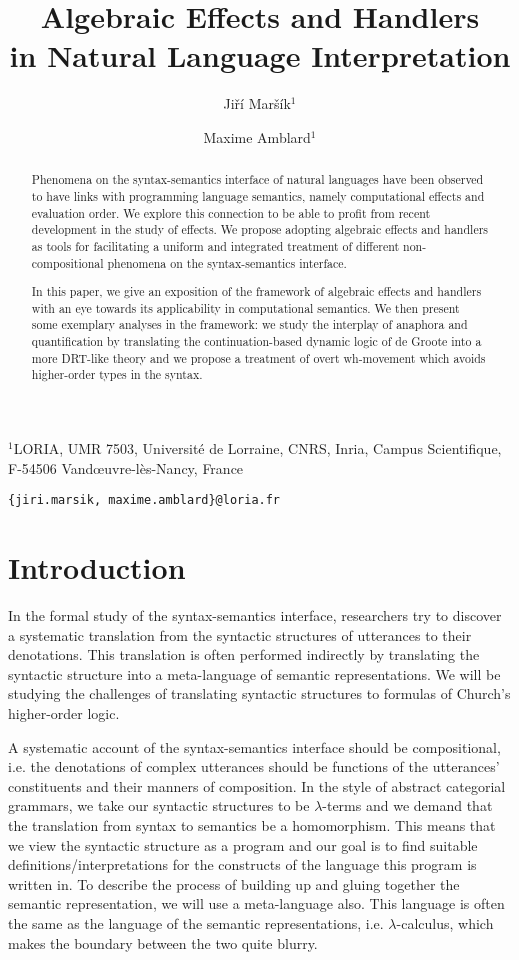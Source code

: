 \documentclass{article}
\title{Algebraic Effects and Handlers \\ in Natural Language Interpretation}
\author{Jiří Maršík$^1$ \and Maxime Amblard$^1$}
\date{}
\begin{document}
\maketitle

\begin{center}
$^1$LORIA, UMR 7503, Université de Lorraine, CNRS, Inria, Campus Scientifique, \\
F-54506 Vand\oe uvre-lès-Nancy, France

\texttt{\{jiri.marsik, maxime.amblard\}@loria.fr}
\end{center}

\begin{abstract}
  Phenomena on the syntax-semantics interface of natural languages have been
  observed to have links with programming language semantics, namely
  computational effects and evaluation order. We explore this connection to be
  able to profit from recent development in the study of effects. We propose
  adopting algebraic effects and handlers as tools for facilitating a uniform
  and integrated treatment of different non-compositional phenomena on the
  syntax-semantics interface.

  In this paper, we give an exposition of the framework of algebraic effects
  and handlers with an eye towards its applicability in computational
  semantics. We then present some exemplary analyses in the framework: we
  study the interplay of anaphora and quantification by translating the
  continuation-based dynamic logic of de Groote into a more DRT-like theory
  and we propose a treatment of overt wh-movement which avoids higher-order
  types in the syntax.
\end{abstract}

\section{Introduction}
\label{sec:motivation}

In the formal study of the syntax-semantics interface, researchers try to
discover a systematic translation from the syntactic structures of utterances
to their denotations. This translation is often performed indirectly by
translating the syntactic structure into a meta-language of semantic
representations. We will be studying the challenges of translating syntactic
structures to formulas of Church's higher-order logic.

A systematic account of the syntax-semantics interface should be
compositional, i.e. the denotations of complex utterances should be functions
of the utterances' constituents and their manners of composition. In the style
of abstract categorial grammars, we take our syntactic structures to be
$\lambda$-terms and we demand that the translation from syntax to semantics be
a homomorphism. This means that we view the syntactic structure as a program
and our goal is to find suitable definitions/interpretations for the
constructs of the language this program is written in. To describe the process
of building up and gluing together the semantic representation, we will use a
meta-language also. This language is often the same as the language of the
semantic representations, i.e. $\lambda$-calculus, which makes the boundary
between the two quite blurry.
\end{document}
